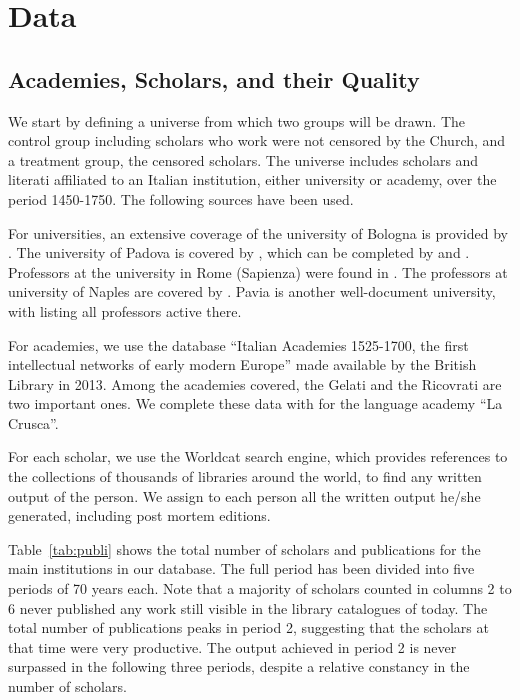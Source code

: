 \documentclass[12pt]{article}
\begin{document}
\section{Data}

\subsection{Academies, Scholars, and their Quality}\label{section:data}

We start by defining a universe from which two groups will be drawn. The control group including scholars who work were not censored by the Church, and a treatment group, the censored scholars. The universe includes  scholars and literati affiliated to an Italian institution, either university or academy, over the period 1450-1750. The following sources have been used.

For universities, an  extensive coverage of the university of Bologna is provided by . The university of Padova is covered by , which can be completed by   and . Professors at the university in Rome (Sapienza) were found in . The professors at university of Naples are covered by . Pavia is another well-document university, with  listing all professors active there.


For academies, we use the database ``Italian Academies 1525-1700, the first intellectual networks of early modern Europe'' made available by the British Library in 2013. Among the academies covered, the Gelati and the Ricovrati are two important ones. We complete these data with   for the language academy ``La Crusca''.

For each scholar, we use the Worldcat search engine, which provides references to  the collections of thousands of libraries around the world, to find any written output of the person. We assign to each person all the written output he/she generated, including post mortem editions.

Table~\ref{tab:publi} shows the total number of scholars and publications for the main institutions in our database. The full period has been divided into five periods of 70 years each. Note that a majority of scholars counted in columns 2 to 6 never published any work still visible in the library catalogues of today.   The total number of publications peaks in period 2, suggesting that the scholars at that time were very productive. The output achieved in period 2 is never surpassed in the following three periods, despite a relative constancy in the number of scholars.
\end{document}
